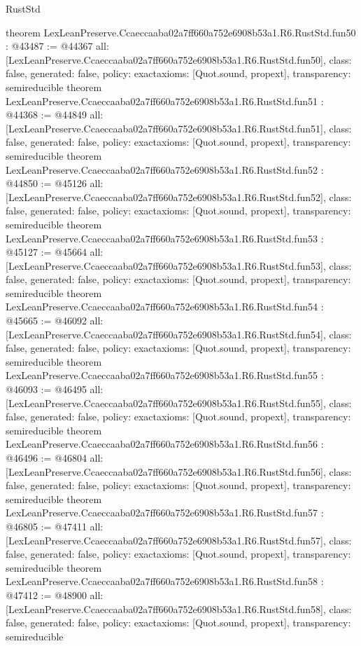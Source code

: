 \begin{lexlean}{RustStd}
\begin{coremodule}
{}
theorem LexLeanPreserve.Ccaeccaaba02a7ff660a752e6908b53a1.R6.RustStd.fun50 : @43487 := @44367 {
  all: [LexLeanPreserve.Ccaeccaaba02a7ff660a752e6908b53a1.R6.RustStd.fun50],
  class: false,
  generated: false,
  policy: exact{axioms: [Quot.sound, propext]},
  transparency: semireducible
}
theorem LexLeanPreserve.Ccaeccaaba02a7ff660a752e6908b53a1.R6.RustStd.fun51 : @44368 := @44849 {
  all: [LexLeanPreserve.Ccaeccaaba02a7ff660a752e6908b53a1.R6.RustStd.fun51],
  class: false,
  generated: false,
  policy: exact{axioms: [Quot.sound, propext]},
  transparency: semireducible
}
theorem LexLeanPreserve.Ccaeccaaba02a7ff660a752e6908b53a1.R6.RustStd.fun52 : @44850 := @45126 {
  all: [LexLeanPreserve.Ccaeccaaba02a7ff660a752e6908b53a1.R6.RustStd.fun52],
  class: false,
  generated: false,
  policy: exact{axioms: [Quot.sound, propext]},
  transparency: semireducible
}
theorem LexLeanPreserve.Ccaeccaaba02a7ff660a752e6908b53a1.R6.RustStd.fun53 : @45127 := @45664 {
  all: [LexLeanPreserve.Ccaeccaaba02a7ff660a752e6908b53a1.R6.RustStd.fun53],
  class: false,
  generated: false,
  policy: exact{axioms: [Quot.sound, propext]},
  transparency: semireducible
}
theorem LexLeanPreserve.Ccaeccaaba02a7ff660a752e6908b53a1.R6.RustStd.fun54 : @45665 := @46092 {
  all: [LexLeanPreserve.Ccaeccaaba02a7ff660a752e6908b53a1.R6.RustStd.fun54],
  class: false,
  generated: false,
  policy: exact{axioms: [Quot.sound, propext]},
  transparency: semireducible
}
theorem LexLeanPreserve.Ccaeccaaba02a7ff660a752e6908b53a1.R6.RustStd.fun55 : @46093 := @46495 {
  all: [LexLeanPreserve.Ccaeccaaba02a7ff660a752e6908b53a1.R6.RustStd.fun55],
  class: false,
  generated: false,
  policy: exact{axioms: [Quot.sound, propext]},
  transparency: semireducible
}
theorem LexLeanPreserve.Ccaeccaaba02a7ff660a752e6908b53a1.R6.RustStd.fun56 : @46496 := @46804 {
  all: [LexLeanPreserve.Ccaeccaaba02a7ff660a752e6908b53a1.R6.RustStd.fun56],
  class: false,
  generated: false,
  policy: exact{axioms: [Quot.sound, propext]},
  transparency: semireducible
}
theorem LexLeanPreserve.Ccaeccaaba02a7ff660a752e6908b53a1.R6.RustStd.fun57 : @46805 := @47411 {
  all: [LexLeanPreserve.Ccaeccaaba02a7ff660a752e6908b53a1.R6.RustStd.fun57],
  class: false,
  generated: false,
  policy: exact{axioms: [Quot.sound, propext]},
  transparency: semireducible
}
theorem LexLeanPreserve.Ccaeccaaba02a7ff660a752e6908b53a1.R6.RustStd.fun58 : @47412 := @48900 {
  all: [LexLeanPreserve.Ccaeccaaba02a7ff660a752e6908b53a1.R6.RustStd.fun58],
  class: false,
  generated: false,
  policy: exact{axioms: [Quot.sound, propext]},
  transparency: semireducible
}
\end{coremodule}
\end{lexlean}
